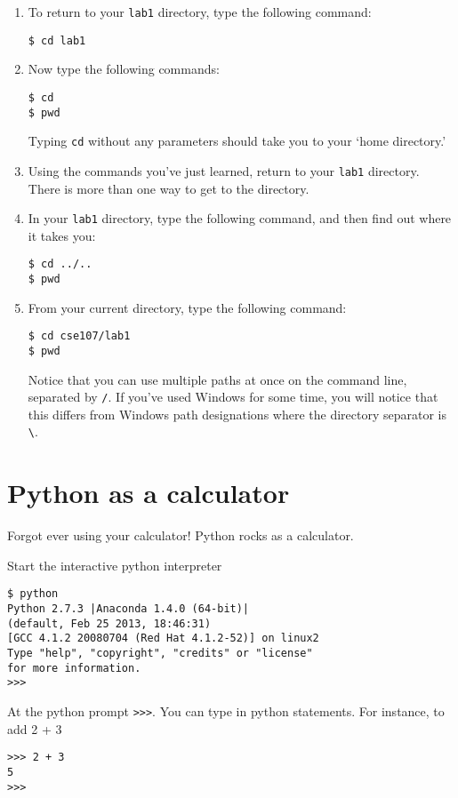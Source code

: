 \documentclass[12pt]{article}
\begin{document}
\begin{enumerate}
\item To return to your \texttt{lab1} directory, type the following command:
\begin{lstlisting}[style=bash]
$ cd lab1
\end{lstlisting}

\item Now type the following commands:
\begin{lstlisting}[style=bash]
$ cd
$ pwd
\end{lstlisting}
Typing \texttt{cd} without any parameters should take you to your `home directory.'

\item Using the commands you've just learned, return to your \texttt{lab1} directory. There is more than one way to get to the directory.

\item In your \texttt{lab1} directory, type the following command, and then find out where it takes you:
\begin{lstlisting}[style=bash]
$ cd ../..
$ pwd
\end{lstlisting}

\item From your current directory, type the following command:
\begin{lstlisting}[style=bash]
$ cd cse107/lab1
$ pwd
\end{lstlisting}
Notice that you can use multiple paths at once on the command line, separated by \texttt{/}. If you've used Windows for some time, you will notice that this differs from Windows path designations where the directory separator is \texttt{\textbackslash}.

\end{enumerate}

\section{Python as a calculator}
Forgot ever using your calculator! Python rocks as a calculator.

Start the interactive python interpreter 
\begin{lstlisting}[style=bash]
$ python
Python 2.7.3 |Anaconda 1.4.0 (64-bit)| 
(default, Feb 25 2013, 18:46:31) 
[GCC 4.1.2 20080704 (Red Hat 4.1.2-52)] on linux2
Type "help", "copyright", "credits" or "license" 
for more information.
>>> 
\end{lstlisting}

At the python prompt \texttt{>>>}. You can type in python statements. For instance, to add 2 + 3 
\begin{lstlisting}[style=bash]
>>> 2 + 3
5
>>>
\end{lstlisting}
\end{document}
